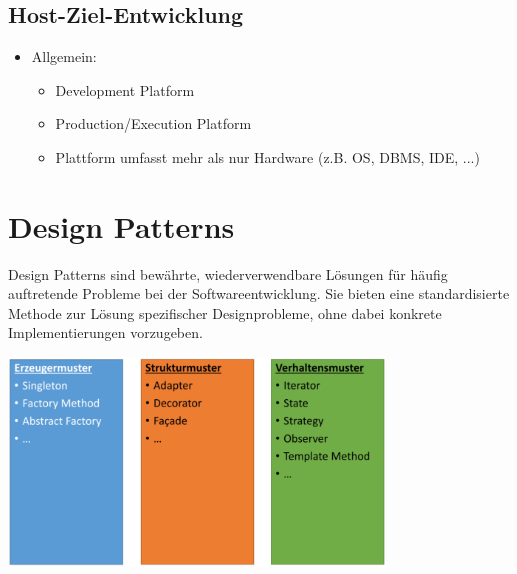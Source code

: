 \documentclass[11pt, a4paper]{article}
\begin{document}
\raggedright \subsection{Host-Ziel-Entwicklung}

\begin{itemize}
    \item Allgemein:
    \begin{itemize}
        \item Development Platform
        \item Production/Execution Platform
        \item Plattform umfasst mehr als nur Hardware (z.B. OS, DBMS, IDE, ...)
    \end{itemize}
\end{itemize}




\section{Design Patterns} %

Design Patterns sind bewährte, wiederverwendbare Lösungen für häufig auftretende Probleme bei der Softwareentwicklung. Sie bieten eine standardisierte Methode zur Lösung spezifischer Designprobleme, ohne dabei konkrete Implementierungen vorzugeben.

\vspace{2em}

\centering \includegraphics[width=0.75\textwidth]{Designpatterns-00.png}

\raggedright

\vspace{2em}
\end{document}
